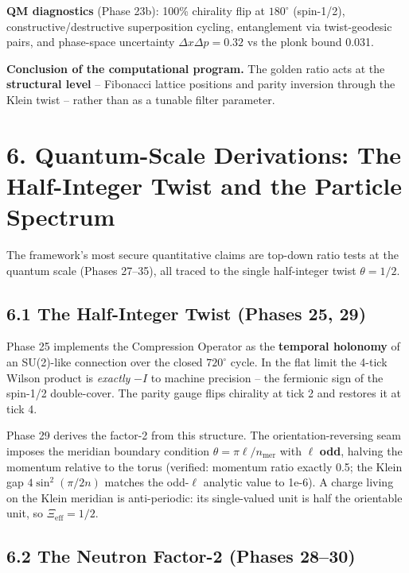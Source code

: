 \documentclass[
  11pt,
]{article}
\begin{document}
\textbf{QM diagnostics} (Phase 23b): 100\% chirality flip at
\(180^{\circ}\) (spin-1/2), constructive/destructive superposition
cycling, entanglement via twist-geodesic pairs, and phase-space
uncertainty \(\Delta x \Delta p = 0.32\) vs the plonk bound 0.031.

\textbf{Conclusion of the computational program.} The golden ratio acts
at the \textbf{structural level} -- Fibonacci lattice positions and
parity inversion through the Klein twist -- rather than as a tunable
filter parameter.

\section{6. Quantum-Scale Derivations: The Half-Integer Twist and the
Particle
Spectrum}\label{quantum-scale-derivations-the-half-integer-twist-and-the-particle-spectrum}

The framework's most secure quantitative claims are top-down ratio tests
at the quantum scale (Phases 27--35), all traced to the single
half-integer twist \(\theta = 1/2\).

\subsection{6.1 The Half-Integer Twist (Phases 25,
29)}\label{the-half-integer-twist-phases-25-29}

Phase 25 implements the Compression Operator as the \textbf{temporal
holonomy} of an SU(2)-like connection over the closed \(720^{\circ}\)
cycle. In the flat limit the 4-tick Wilson product is \emph{exactly}
\(-I\) to machine precision -- the fermionic sign of the spin-1/2
double-cover. The parity gauge flips chirality at tick 2 and restores it
at tick 4.

Phase 29 derives the factor-2 from this structure. The
orientation-reversing seam imposes the meridian boundary condition
\(\theta = \pi\ell/n_{\text{mer}}\) with \(\ell\) \textbf{odd}, halving
the momentum relative to the torus (verified: momentum ratio exactly
0.5; the Klein gap \(4\sin^2(\pi/2n)\) matches the odd-\(\ell\) analytic
value to 1e-6). A charge living on the Klein meridian is anti-periodic:
its single-valued unit is half the orientable unit, so
\(\Xi_{\text{eff}} = 1/2\).

\subsection{6.2 The Neutron Factor-2 (Phases
28--30)}\label{the-neutron-factor-2-phases-2830}
\end{document}
